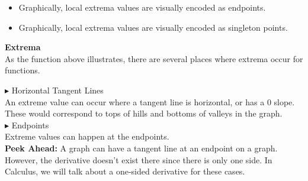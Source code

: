 \documentclass{ximera}
\begin{document}
\begin{itemize}
\item Graphically, local extrema values are visually encoded as endpoints.
\item Graphically, local extrema values are visually encoded as singleton points.
\end{itemize}



\begin{template} \textbf{\textcolor{blue!55!black}{Extrema}} \\

As the function above illustrates, there are several places where extrema occur for functions.


\textbf{\textcolor{red!90!darkgray}{$\blacktriangleright$}} Horizontal Tangent Lines \\

An extreme value can occur where a tangent line is horizontal, or has a $0$ slope.  These would correspond to tops of hills and bottoms of valleys in the graph. \\




\textbf{\textcolor{red!90!darkgray}{$\blacktriangleright$}} Endpoints \\

Extreme values can happen at the endpoints. \\

\textbf{\textcolor{red!90!darkgray}{Peek Ahead:}} A graph can have a tangent line at an endpoint on a graph.  However, the derivative doesn't exist there since there is only one side.  In Calculus, we will talk about a one-sided derivative for these cases. \\

\end{template}
\end{document}
